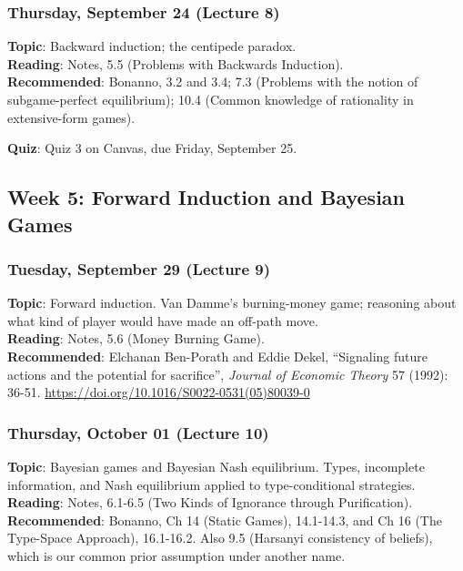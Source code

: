 \documentclass[
  letterpaper,
  DIV=11,
  numbers=noendperiod]{scrartcl}
\begin{document}
\subsubsection{Thursday, September 24 (Lecture
8)}\label{thursday-september-24-lecture-8}

\textbf{Topic}: Backward induction; the centipede paradox.\\
\textbf{Reading}: Notes, 5.5 (Problems with Backwards Induction).\\
\textbf{Recommended}: Bonanno, 3.2 and 3.4; 7.3 (Problems with the
notion of subgame-perfect equilibrium); 10.4 (Common knowledge of
rationality in extensive-form games).

\textbf{Quiz}: Quiz 3 on Canvas, due Friday, September 25.

\subsection{Week 5: Forward Induction and Bayesian
Games}\label{week-5-forward-induction-and-bayesian-games}

\subsubsection{Tuesday, September 29 (Lecture
9)}\label{tuesday-september-29-lecture-9}

\textbf{Topic}: Forward induction. Van Damme's burning-money game;
reasoning about what kind of player would have made an off-path move.\\
\textbf{Reading}: Notes, 5.6 (Money Burning Game).\\
\textbf{Recommended}: Elchanan Ben-Porath and Eddie Dekel, ``Signaling
future actions and the potential for sacrifice'', \emph{Journal of
Economic Theory} 57 (1992): 36-51.
\url{https://doi.org/10.1016/S0022-0531(05)80039-0}

\subsubsection{Thursday, October 01 (Lecture
10)}\label{thursday-october-01-lecture-10}

\textbf{Topic}: Bayesian games and Bayesian Nash equilibrium. Types,
incomplete information, and Nash equilibrium applied to type-conditional
strategies.\\
\textbf{Reading}: Notes, 6.1-6.5 (Two Kinds of Ignorance through
Purification).\\
\textbf{Recommended}: Bonanno, Ch 14 (Static Games), 14.1-14.3, and Ch
16 (The Type-Space Approach), 16.1-16.2. Also 9.5 (Harsanyi consistency
of beliefs), which is our common prior assumption under another name.
\end{document}
